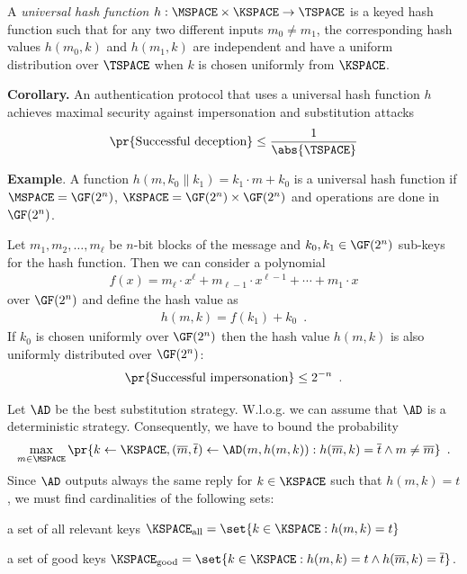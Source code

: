 \documentclass[landscape,footrule]{foils}
\begin{document}


A \emph{universal hash function} $h:\MSPACE\times\KSPACE\to \TSPACE$
is a keyed hash function such that for any two different inputs
$m_0\neq m_1$, the corresponding hash values $h(m_0,k)$ and $h(m_1,k)$
are independent and have a uniform distribution over $\TSPACE$ when
$k$ is chosen uniformly from $\KSPACE$.

\textbf{Corollary.} An authentication protocol that uses a universal
hash function $h$ achieves maximal security against impersonation and
substitution attacks
\begin{align*}
  \pr{\text{Successful deception}}\leq \frac{1}{\abs{\TSPACE}}
\end{align*}

\textbf{Example}. A function $h(m,k_0\|k_1)=k_1\cdot m+k_0$ is a
universal hash function if $\MSPACE=\GF(2^n)$,
$\KSPACE=\GF(2^n)\times\GF(2^n)$ and operations are done
in~$\GF(2^n)$.


Let $m_1,m_2,\ldots,m_\ell$ be $n$-bit blocks of the message and
$k_0,k_1\in\GF(2^n)$ sub-keys for the hash function. Then we can
consider a polynomial
\begin{align*}
  f(x)=m_\ell\cdot x^\ell+m_{\ell-1}\cdot x^{\ell-1}+\cdots+m_1\cdot x 
\end{align*}
over $\GF(2^n)$ and define the hash value as 
\begin{align*}
  h(m,k)=f(k_1)+k_0\enspace.
\end{align*}
If $k_0$ is chosen uniformly over $\GF(2^n)$ then the hash value
$h(m,k)$ is also uniformly distributed over $\GF(2^n)$:
\begin{align*}
  \pr{\text{Successful impersonation}}\leq 2^{-n}\enspace.
\end{align*}


Let $\AD$ be the best substitution strategy. W.l.o.g. we can assume
that $\AD$ is a deterministic strategy. Consequently, we have to bound
the  probability
\begin{align*}
  \max_{m\in\MSPACE} \pr{k\gets\KSPACE,
    (\overline{m},\overline{t})\gets
    \AD(m,h(m,k)):h(\overline{m},k)=\overline{t}\wedge m\neq\overline{m}}\enspace.
\end{align*}
Since $\AD$ outputs always the same reply for $k\in\KSPACE$ such that
$h(m,k)=t$, we must find cardinalities of the following sets:
\begin{triangles}
  \item a set of all relevant keys $\KSPACE_{\mathrm{all}}=\set{k\in\KSPACE: h(m,k)=t}$
  \item a set of good keys $\KSPACE_{\mathrm{good}}=\set{k\in\KSPACE:
      h(m,k)=t\wedge h(\overline{m},k)=\overline{t}}$.
\end{triangles}
\end{document}
